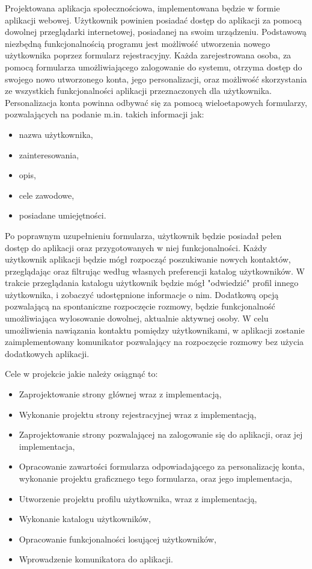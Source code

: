 \documentclass[12pt,a4paper]{article}
\begin{document}
Projektowana aplikacja społecznościowa, implementowana będzie w formie aplikacji webowej. Użytkownik powinien posiadać dostęp do aplikacji za pomocą dowolnej przeglądarki internetowej, posiadanej na swoim urządzeniu. Podstawową niezbędną funkcjonalnością programu jest możliwość utworzenia nowego użytkownika poprzez formularz rejestracyjny. Każda zarejestrowana osoba, za pomocą formularza umożliwiającego zalogowanie do systemu, otrzyma dostęp do swojego nowo utworzonego konta, jego personalizacji, oraz możliwość skorzystania ze wszystkich funkcjonalności aplikacji przeznaczonych dla użytkownika. Personalizacja konta powinna odbywać się za pomocą wieloetapowych formularzy, pozwalających na podanie m.in. takich informacji jak: 
\begin{itemize}
    \item nazwa użytkownika,
    \item zainteresowania, 
    \item opis, 
    \item cele zawodowe, 
    \item posiadane umiejętności.
\end{itemize}
Po poprawnym uzupełnieniu formularza, użytkownik będzie posiadał pełen dostęp do aplikacji oraz przygotowanych w niej funkcjonalności. Każdy użytkownik aplikacji będzie mógł rozpocząć poszukiwanie nowych kontaktów, przeglądając oraz filtrując według własnych preferencji katalog użytkowników. W trakcie przeglądania katalogu użytkownik będzie mógł "odwiedzić" profil innego użytkownika, i zobaczyć udostępnione informacje o nim. Dodatkową opcją pozwalającą na spontaniczne rozpoczęcie rozmowy, będzie funkcjonalność umożliwiająca wylosowanie dowolnej, aktualnie aktywnej osoby. W celu umożliwienia nawiązania kontaktu pomiędzy użytkownikami, w aplikacji zostanie zaimplementowany komunikator pozwalający na rozpoczęcie rozmowy bez użycia dodatkowych aplikacji. 

Cele w projekcie jakie należy osiągnąć to: 
\begin{itemize}
    \item Zaprojektowanie strony głównej wraz z implementacją,
    \item Wykonanie projektu strony rejestracyjnej wraz z implementacją, 
    \item Zaprojektowanie strony pozwalającej na zalogowanie się do aplikacji, oraz jej implementacja,
    \item Opracowanie zawartości formularza odpowiadającego za personalizację konta, wykonanie projektu graficznego tego formularza, oraz jego implementacja,
    \item Utworzenie projektu profilu użytkownika, wraz z implementacją, 
    \item Wykonanie katalogu użytkowników, 
    \item Opracowanie funkcjonalności losującej użytkowników, 
    \item Wprowadzenie komunikatora do aplikacji. 
\end{itemize}
\end{document}
